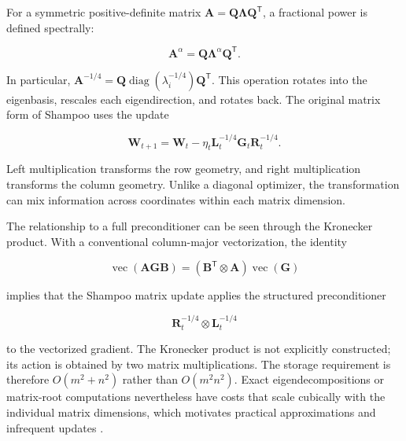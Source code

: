 For a symmetric positive-definite matrix
$\mathbf{A}=\mathbf{Q}\boldsymbol{\Lambda}\mathbf{Q}^{\mathsf{T}}$,
a fractional power is defined spectrally:

\begin{equation}
    \mathbf{A}^{\alpha}
    =
    \mathbf{Q}\boldsymbol{\Lambda}^{\alpha}\mathbf{Q}^{\mathsf{T}}.
    \label{eq:opt-matrix-fractional-power}
\end{equation}

In particular,
$\mathbf{A}^{-1/4}
=\mathbf{Q}\operatorname{diag}(\lambda_i^{-1/4})\mathbf{Q}^{\mathsf{T}}$.
This operation rotates into the eigenbasis, rescales each eigendirection,
and rotates back. The original matrix form of Shampoo uses the update

\begin{equation}
    \boxed{
    \mathbf{W}_{t+1}
    =
    \mathbf{W}_t
    -
    \eta_t
    \mathbf{L}_t^{-1/4}
    \mathbf{G}_t
    \mathbf{R}_t^{-1/4}.
    }
    \label{eq:opt-shampoo-matrix-update}
\end{equation}

Left multiplication transforms the row geometry, and right multiplication
transforms the column geometry. Unlike a diagonal optimizer, the
transformation can mix information across coordinates within each matrix
dimension.

The relationship to a full preconditioner can be seen through the
Kronecker product. With a conventional column-major vectorization,
the identity

\begin{equation}
    \operatorname{vec}(\mathbf{A}\mathbf{G}\mathbf{B})
    =
    (\mathbf{B}^{\mathsf{T}}\otimes\mathbf{A})
    \operatorname{vec}(\mathbf{G})
    \label{eq:opt-vec-kronecker}
\end{equation}

implies that the Shampoo matrix update applies the structured
preconditioner

\begin{equation}
    \mathbf{R}_t^{-1/4}\otimes\mathbf{L}_t^{-1/4}
    \label{eq:opt-shampoo-kronecker}
\end{equation}

to the vectorized gradient. The Kronecker product is not explicitly
constructed; its action is obtained by two matrix multiplications.
The storage requirement is therefore $O(m^2+n^2)$ rather than
$O(m^2n^2)$. Exact eigendecompositions or matrix-root computations
nevertheless have costs that scale cubically with the individual
matrix dimensions, which motivates practical approximations and
infrequent updates \parencite{Gupta2018Shampoo,Vyas2025SOAP}.

